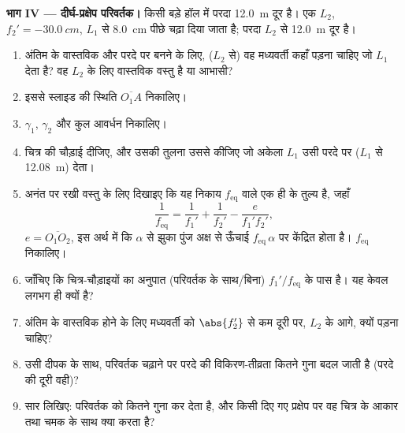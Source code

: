 \begin{problem}
\medskip
\noindent\textbf{भाग IV --- दीर्घ-प्रक्षेप परिवर्तक।}
किसी बड़े हॉल में परदा \qty{12.0}{m} दूर है। एक 
$L_2$, $f_2' = \qty{-30.0}{cm}$, $L_1$ से \qty{8.0}{cm} पीछे चढ़ा दिया
जाता है; परदा $L_2$ से \qty{12.0}{m} दूर है।
\begin{enumerate}[resume]
  \item अंतिम  के वास्तविक और परदे पर बनने के लिए, ($L_2$ से) वह
        मध्यवर्ती  कहाँ पड़ना चाहिए जो $L_1$ देता है? वह $L_2$ के
        लिए वास्तविक वस्तु है या आभासी?
  \item इससे स्लाइड की स्थिति $\overline{O_1A}$ निकालिए।
  \item $\gamma_1$, $\gamma_2$ और कुल आवर्धन निकालिए।
  \item चित्र की चौड़ाई दीजिए, और उसकी तुलना उससे कीजिए जो अकेला $L_1$ उसी
        परदे पर ($L_1$ से \qty{12.08}{m}) देता।
  \item अनंत पर रखी वस्तु के लिए दिखाइए कि यह निकाय 
        $f_{\mathrm{eq}}$ वाले एक ही  के तुल्य है, जहाँ
        \[
        \frac{1}{f_{\mathrm{eq}}} = \frac{1}{f_1'} + \frac{1}{f_2'} - \frac{e}{f_1' f_2'},
        \]
        $e = \overline{O_1O_2}$, इस अर्थ में कि $\alpha$ से झुका पुंज
        अक्ष से ऊँचाई $f_{\mathrm{eq}}\,\alpha$ पर केंद्रित होता है।
        $f_{\mathrm{eq}}$ निकालिए।
  \item जाँचिए कि चित्र-चौड़ाइयों का अनुपात (परिवर्तक के साथ/बिना)
        $f_1'/f_{\mathrm{eq}}$ के पास है। यह केवल लगभग ही क्यों है?
  \item अंतिम  के वास्तविक होने के लिए मध्यवर्ती  को
        $\abs{f_2'}$ से कम दूरी पर, $L_2$ के आगे, क्यों पड़ना चाहिए?
  \item उसी दीपक के साथ, परिवर्तक चढ़ाने पर परदे की विकिरण-तीव्रता कितने
        गुना बदल जाती है (परदे की दूरी वही)?
  \item सार लिखिए: परिवर्तक  को कितने गुना कर देता है, और किसी दिए
        गए प्रक्षेप पर वह चित्र के आकार तथा चमक के साथ क्या करता है?
\end{enumerate}
\end{problem}

